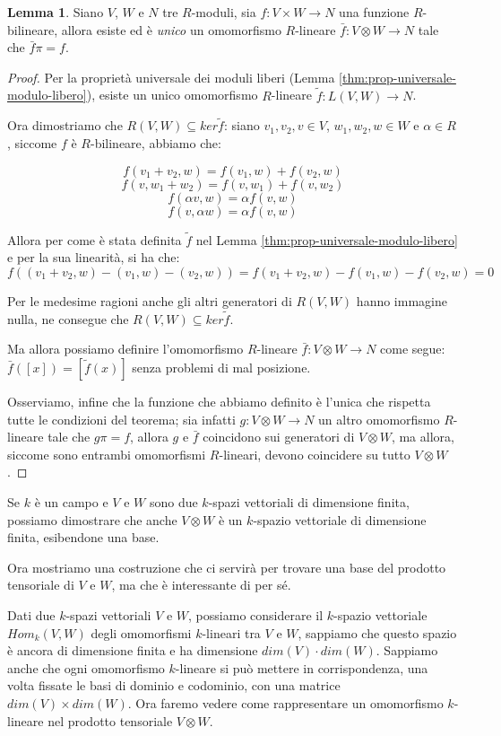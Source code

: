 \documentclass[12pt, a4paper]{article}
\theoremstyle{definition}
\newtheorem{lem}{Lemma}
\begin{document}
\begin{lem}
Siano $V$, $W$ e $N$ tre $R$-moduli, sia $f : V \times W \to N$ una funzione $R$-bilineare, allora esiste ed è \emph{unico} un omomorfismo $R$-lineare
$\bar{f} : V \otimes W \to N$ tale che $\bar{f} \pi = f$.
\end{lem}

\begin{proof}
Per la proprietà universale dei moduli liberi (Lemma \ref{thm:prop-universale-modulo-libero}), esiste un unico omomorfismo $R$-lineare $\widetilde{f} : L(V, W) \to N$.

Ora dimostriamo che $R(V, W) \subseteq ker \widetilde{f}$: siano $v_1, v_2, v \in V$, $w_1, w_2, w \in W$ e $\alpha \in R$, siccome $f$ è $R$-bilineare, abbiamo che:

$$f(v_1 + v_2, w) = f(v_1, w) + f(v_2, w)$$
$$f(v, w_1 + w_2) = f(v, w_1) + f(v, w_2)$$
$$f(\alpha v, w) = \alpha f(v, w)$$
$$f(v, \alpha w) = \alpha f(v, w)$$

Allora per come è stata definita $\widetilde{f}$ nel Lemma \ref{thm:prop-universale-modulo-libero} e per la sua linearità, si ha che:
$$f((v_1 + v_2, w) - (v_1, w) - (v_2, w)) = f(v_1 + v_2, w) - f(v_1, w) - f(v_2, w) = 0$$

Per le medesime ragioni anche gli altri generatori di $R(V, W)$ hanno immagine nulla, ne consegue che $R(V, W) \subseteq ker \widetilde{f}$.

Ma allora possiamo definire l'omomorfismo $R$-lineare $\bar{f} : V \otimes W \to N$ come segue: $\bar{f}([x]) = [\widetilde{f}(x)]$ senza problemi di mal posizione.

Osserviamo, infine che la funzione che abbiamo definito è l'unica che rispetta tutte le condizioni del teorema; sia infatti $g : V \otimes W \to N$ un altro omomorfismo $R$-lineare
tale che $g \pi = f$, allora $g$ e $\bar{f}$ coincidono sui generatori di $V \otimes W$, ma allora, siccome sono entrambi omomorfismi $R$-lineari, devono coincidere su tutto $V \otimes W$.
\end{proof}

Se $k$ è un campo e $V$ e $W$ sono due $k$-spazi vettoriali di dimensione finita, possiamo dimostrare che anche $V \otimes W$ è un $k$-spazio vettoriale di dimensione finita, esibendone una base.

Ora mostriamo una costruzione che ci servirà per trovare una base del prodotto tensoriale di $V$ e $W$, ma che è interessante di per sé.

Dati due $k$-spazi vettoriali $V$ e $W$, possiamo considerare il $k$-spazio vettoriale $Hom_k(V, W)$ degli omomorfismi $k$-lineari tra $V$ e $W$, sappiamo che questo spazio
è ancora di dimensione finita e ha dimensione $dim(V) \cdot dim(W)$. Sappiamo anche che ogni omomorfismo $k$-lineare si può mettere in corrispondenza, una volta fissate le basi di dominio
e codominio, con una matrice $dim(V) \times dim(W)$. Ora faremo vedere come rappresentare un omomorfismo $k$-lineare nel prodotto tensoriale $V \otimes W$.
\end{document}

